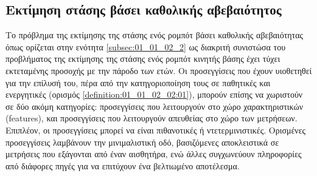 \subsection{Εκτίμηση στάσης βάσει καθολικής αβεβαιότητος}
\label{subsection:02_03_02:01}

Το πρόβλημα της εκτίμησης της στάσης ενός ρομπότ βάσει καθολικής αβεβαιότητας
όπως ορίζεται στην ενότητα \ref{subsec:01_01_02_2} ως διακριτή συνιστώσα του
προβλήματος της εκτίμησης της στάσης ενός ρομπότ κινητής βάσης έχει τύχει
εκτεταμένης προσοχής με την πάροδο των ετών. Οι προσεγγίσεις που έχουν
υιοθετηθεί για την επίλυσή του, πέρα από την κατηγοριοποίηση τους σε παθητικές
και ενεργητικές (ορισμός \ref{definition:01_01_02_02:01}), μπορούν επίσης να
χωριστούν σε δύο ακόμη κατηγορίες: προσεγγίσεις που λειτουργούν στο χώρο
χαρακτηριστικών (features), και προσεγγίσεις που λειτουργούν απευθείας στο χώρο
των μετρήσεων. Επιπλέον, οι προσεγγίσεις μπορεί να είναι πιθανοτικές ή
ντετερμινιστικές. Ορισμένες προσεγγίσεις λαμβάνουν την μινιμαλιστική οδό,
βασιζόμενες αποκλειστικά σε μετρήσεις που εξάγονται από έναν αισθητήρα, ενώ
άλλες συγχωνεύουν πληροφορίες από διάφορες πηγές για να επιτύχουν ένα
βελτιωμένο αποτέλεσμα.

